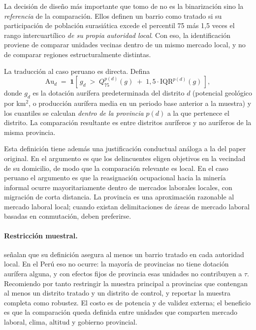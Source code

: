\documentclass[11pt,a4paper]{article}
\newcommand{\Au}{\mathrm{Au}}
\begin{document}
La decisión de diseño más importante que tomo de \citet{braakmann2024} no es la binarización sino la \emph{referencia} de la comparación. Ellos definen un barrio como tratado si su participación de población surasiática excede el percentil 75 más 1{,}5 veces el rango intercuartílico \emph{de su propia autoridad local}. Con eso, la identificación proviene de comparar unidades vecinas dentro de un mismo mercado local, y no de comparar regiones estructuralmente distintas.

La traducción al caso peruano es directa. Defina
\begin{equation}
\Au_d \;=\; \mathbf{1}\!\left[\, g_d \;>\; Q_{75}^{p(d)}(g) \;+\; 1{,}5 \cdot \mathrm{IQR}^{p(d)}(g) \,\right],
\label{eq:tratamiento}
\end{equation}
donde $g_d$ es la dotación aurífera predeterminada del distrito $d$ (potencial geológico por km$^2$, o producción aurífera media en un periodo base anterior a la muestra) y los cuantiles se calculan \emph{dentro de la provincia} $p(d)$ a la que pertenece el distrito. La comparación resultante es entre distritos auríferos y no auríferos de la misma provincia.

Esta definición tiene además una justificación conductual análoga a la del paper original. En \citet{braakmann2024} el argumento es que los delincuentes eligen objetivos en la vecindad de su domicilio, de modo que la comparación relevante es local. En el caso peruano el argumento es que la reasignación ocupacional hacia la minería informal ocurre mayoritariamente dentro de mercados laborales locales, con migración de corta distancia. La provincia es una aproximación razonable al mercado laboral local; cuando existan delimitaciones de áreas de mercado laboral basadas en conmutación, deben preferirse.

\paragraph{Restricción muestral.} \citet{braakmann2024} señalan que su definición asegura al menos un barrio tratado en cada autoridad local. En el Perú eso no ocurre: la mayoría de provincias no tiene dotación aurífera alguna, y con efectos fijos de provincia esas unidades no contribuyen a $\tau$. Recomiendo por tanto restringir la muestra principal a provincias que contengan al menos un distrito tratado y un distrito de control, y reportar la muestra completa como robustez. El costo es de potencia y de validez externa; el beneficio es que la comparación queda definida entre unidades que comparten mercado laboral, clima, altitud y gobierno provincial.
\end{document}
